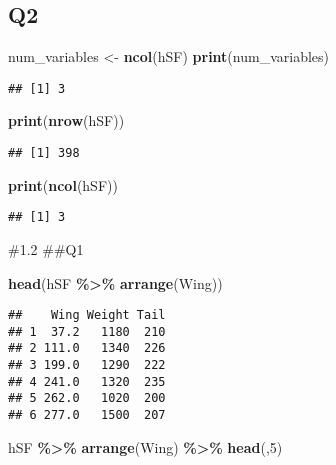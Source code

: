 \documentclass[
]{article}
\newenvironment{Shaded}{\begin{snugshade}}{\end{snugshade}}
\newcommand{\DecValTok}[1]{\textcolor[rgb]{0.00,0.00,0.81}{#1}}
\newcommand{\FunctionTok}[1]{\textcolor[rgb]{0.13,0.29,0.53}{\textbf{#1}}}
\newcommand{\NormalTok}[1]{#1}
\newcommand{\OtherTok}[1]{\textcolor[rgb]{0.56,0.35,0.01}{#1}}
\newcommand{\SpecialCharTok}[1]{\textcolor[rgb]{0.81,0.36,0.00}{\textbf{#1}}}
\begin{document}
\hypertarget{q2}{%
\subsection{Q2}\label{q2}}

\begin{Shaded}
\begin{Highlighting}[]
\NormalTok{ num\_variables }\OtherTok{\textless{}{-}} \FunctionTok{ncol}\NormalTok{(hSF)}
 \FunctionTok{print}\NormalTok{(num\_variables)}
\end{Highlighting}
\end{Shaded}

\begin{verbatim}
## [1] 3
\end{verbatim}

\begin{Shaded}
\begin{Highlighting}[]
 \FunctionTok{print}\NormalTok{(}\FunctionTok{nrow}\NormalTok{(hSF))}
\end{Highlighting}
\end{Shaded}

\begin{verbatim}
## [1] 398
\end{verbatim}

\begin{Shaded}
\begin{Highlighting}[]
 \FunctionTok{print}\NormalTok{(}\FunctionTok{ncol}\NormalTok{(hSF))}
\end{Highlighting}
\end{Shaded}

\begin{verbatim}
## [1] 3
\end{verbatim}

\#1.2 \#\#Q1

\begin{Shaded}
\begin{Highlighting}[]
\FunctionTok{head}\NormalTok{(hSF }\SpecialCharTok{\%\textgreater{}\%} \FunctionTok{arrange}\NormalTok{(Wing))}
\end{Highlighting}
\end{Shaded}

\begin{verbatim}
##    Wing Weight Tail
## 1  37.2   1180  210
## 2 111.0   1340  226
## 3 199.0   1290  222
## 4 241.0   1320  235
## 5 262.0   1020  200
## 6 277.0   1500  207
\end{verbatim}

\begin{Shaded}
\begin{Highlighting}[]
\NormalTok{hSF }\SpecialCharTok{\%\textgreater{}\%} \FunctionTok{arrange}\NormalTok{(Wing) }\SpecialCharTok{\%\textgreater{}\%} \FunctionTok{head}\NormalTok{(,}\DecValTok{5}\NormalTok{)}
\end{Highlighting}
\end{Shaded}
\end{document}
